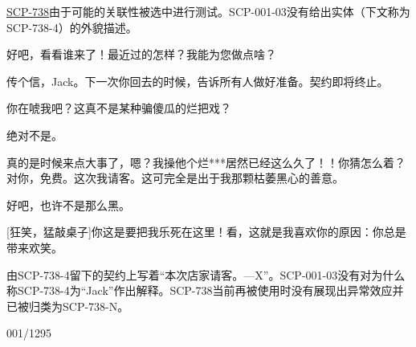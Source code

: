 \begin{scpbox}

\hyperref[chhap:SCP-738]{SCP-738}由于可能的关联性被选中进行测试。SCP-001-03没有给出实体（下文称为SCP-738-4）的外貌描述。

\begin{scpbox}


 好吧，看看谁来了！最近过的怎样？我能为您做点啥？

 传个信，Jack。下一次你回去的时候，告诉所有人做好准备。契约即将终止。

 你在唬我吧？这真不是某种骗傻瓜的烂把戏？

 绝对不是。

 真的是时候来点大事了，嗯？我操他个烂***居然已经这么久了！！你猜怎么着？对你，免费。这次我请客。这可完全是出于我那颗枯萎黑心的善意。

好吧，也许不是那么黑。

[狂笑，猛敲桌子]你这是要把我乐死在这里！看，这就是我喜欢你的原因：你总是带来欢笑。


\end{scpbox}

 由SCP-738-4留下的契约上写着“本次店家请客。—X”。SCP-001-03没有对为什么称SCP-738-4为“Jack”作出解释。SCP-738当前再被使用时没有展现出异常效应并已被归类为SCP-738-N。

\end{scpbox}

001/1295

